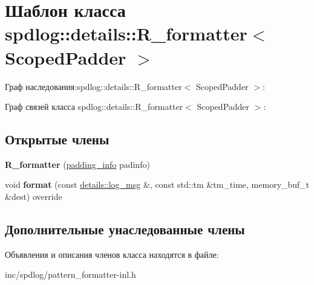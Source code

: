 \hypertarget{classspdlog_1_1details_1_1R__formatter}{}\section{Шаблон класса spdlog\+:\+:details\+:\+:R\+\_\+formatter$<$ Scoped\+Padder $>$}
\label{classspdlog_1_1details_1_1R__formatter}


Граф наследования\+:spdlog\+:\+:details\+:\+:R\+\_\+formatter$<$ Scoped\+Padder $>$\+:


Граф связей класса spdlog\+:\+:details\+:\+:R\+\_\+formatter$<$ Scoped\+Padder $>$\+:
\subsection*{Открытые члены}
\begin{DoxyCompactItemize}
\item 
\mbox{\label{classspdlog_1_1details_1_1R__formatter_a06066fae5bfa91f132dc8d3ecfe27b0d}} 
{\bfseries R\+\_\+formatter} (\hyperlink{structspdlog_1_1details_1_1padding__info}{padding\+\_\+info} padinfo)
\item 
\mbox{\label{classspdlog_1_1details_1_1R__formatter_abf15352272216c3d34ad5b99ea9144c0}} 
void {\bfseries format} (const \hyperlink{structspdlog_1_1details_1_1log__msg}{details\+::log\+\_\+msg} \&, const std\+::tm \&tm\+\_\+time, memory\+\_\+buf\+\_\+t \&dest) override
\end{DoxyCompactItemize}
\subsection*{Дополнительные унаследованные члены}


Объявления и описания членов класса находятся в файле\+:\begin{DoxyCompactItemize}
\item 
inc/spdlog/pattern\+\_\+formatter-\/inl.\+h\end{DoxyCompactItemize}
